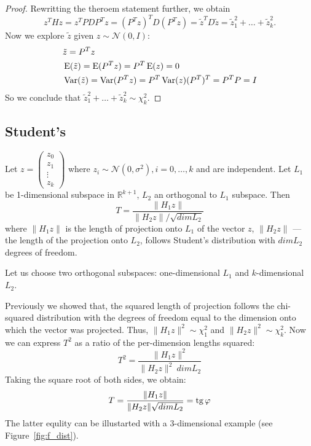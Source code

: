 \begin{proof}
Rewritting the theroem statement further, we obtain
\[
z^T H z = z^T P D P^T z = (P^T z)^T D (P^T z) = \tilde z^T D \tilde z = \tilde z_1^2 + \ldots + \tilde z_k^2.
\]
Now we explore $\tilde z$ given $z \sim \mathcal{N}(0, I)$:
\begin{align*}
&\tilde z = P^T z \\
&\operatorname{E}(\tilde z) = \operatorname{E}(P^T z) = P^T \operatorname{E}(z) = 0 \\
&\operatorname{Var}(\tilde z) = \operatorname{Var}(P^T z) = P^T \operatorname{Var}(z) (P^T)^T = P^T P = I
\end{align*}
So we conclude that $\tilde z_1^2 + \ldots + \tilde z_k^2 \sim \chi^2_k$.

\end{proof}


\subsection{Student's}


\begin{definition}
Let  $z = \begin{pmatrix} z_0 \\ z_1 \\ \vdots \\ z_k \end{pmatrix}$
where $z_i \sim \mathcal{N}(0, \sigma^2), i=0, \ldots, k$ and are independent.
Let $L_1$ be 1-dimensional subspace in $\mathbb{R}^{k+1}$, $L_2$ an orthogonal to $L_1$ subspace.
Then
\[
T = \frac{\lVert H_1 z \rVert}{\lVert H_2 z \rVert / \sqrt{dim L_2}}
\]
where $\lVert H_1 z \rVert$ is the length of projection onto $L_1$ of the vector $z$,
$\lVert H_2 z \rVert$ — the length of the projection onto $L_2$,
follows Student's distribution with $dim L_2$ degrees of freedom.
\end{definition}

Let us choose two orthogonal subspaces: one-dimensional $L_1$ and
$k$-dimensional $L_2$.

Previously we showed that, the squared length of projection follows
the chi-squared distribution with the degrees of freedom equal to the dimension
onto which the vector was projected. Thus, $\lVert H_1 z \rVert^2 \sim \chi^2_1$
and $\lVert H_2 z \rVert^2 \sim \chi^2_{k}$.
Now we can express $T^2$ as a ratio of the per-dimension lengths squared:
\[
T^2 = \frac{\lVert H_1 z \rVert^2}{\lVert H_2 z \rVert^2 \ dim L_2}
\]
Taking the square root of both sides, we obtain:
\[
T = \frac{\lVert H_1 z \rVert}{\lVert H_2 z \rVert  \sqrt{dim L_2}} = \operatorname{tg} \varphi
\]
The latter equlity can be illustarted with a $3$-dimensional example (see Figure~\ref{fig:f_dist}).





